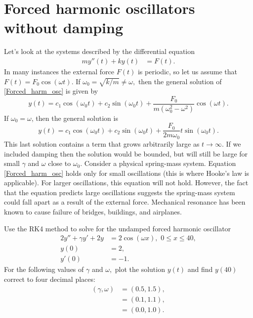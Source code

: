 \section*{Forced harmonic oscillators without damping}
Let's look at the systems described by the differential equation
\begin{align}
my''(t)  + ky(t) &= F(t). \label{Forced_harm_osc}
\end{align}
In many instances the external force $F(t)$ is periodic, so let us assume that $F(t) = F_0 \cos(\omega t)$. If $\omega_0 = \sqrt{k/m} \not = \omega,$ then the  general solution of \ref{Forced_harm_osc} is given by 
\[y(t) = c_1 \cos (\omega_0 t) + c_2\sin (\omega_0 t) + \frac{F_0}{m(\omega_0^2 - \omega^2)} \cos (\omega t).\]
If $\omega_0 = \omega$, then the general solution is 
\[y(t) = c_1 \cos (\omega_0 t) + c_2\sin (\omega_0 t) + \frac{F_0}{2m\omega_0} t \sin (\omega_0 t).\]
This last solution contains a term that grows arbitrarily large as $t \to \infty$. 
If we included damping then the solution would be bounded, but will still be large for small $\gamma$ and $\omega$ close to $\omega_0$. 
Consider a physical spring-mass system. 
Equation \ref{Forced_harm_osc} holds only for small oscillations (this is where Hooke's law is applicable). 
For larger oscillations, this equation will not hold. 
However, the fact that the equation predicts large oscillations suggests the spring-mass system could fall apart as a result of the external force. Mechanical resonance has 
been known to cause failure of bridges, buildings, and airplanes.



\begin{problem}
Use the RK4 method to solve for the undamped forced harmonic oscillator
\begin{align*}
2y'' + \gamma y' + 2y &= 2 \cos (\omega x), \,\, 0 \leq x \leq 40,\\
y(0) &= 2, \\
y'(0) &= -1.
\end{align*} 
For the following values of $\gamma$ and $\omega,$ plot the solution $y(t)$ and find $y(40)$ correct to four decimal places: 
\begin{align*}
	(\gamma, \omega) &= (0.5, 1.5),\\
	 &= (0.1, 1.1), \\
	&= (0.0, 1.0).
\end{align*}
\end{problem}


